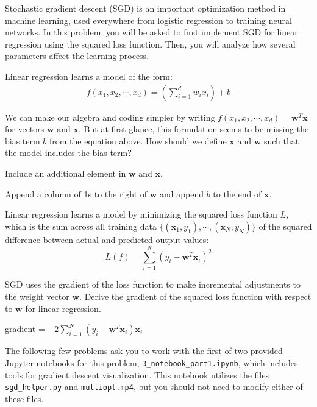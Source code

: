 Stochastic gradient descent (SGD) is an important optimization method in machine learning, used everywhere from logistic regression to training neural networks. In this problem, you will be asked to first implement SGD for linear regression using the squared loss function. Then, you will analyze how several parameters affect the learning process.

Linear regression learns a model of the form:
\begin{align*}
  f(x_1, x_2, \cdots, x_d) = \left(\sum_{i=1}^d w_i x_i\right) + b
\end{align*}

\begin{problem}[2]
  We can make our algebra and coding simpler by writing $f(x_1, x_2, \cdots, x_d) = \mathbf{w}^T\mathbf{x}$ for vectors $\mathbf{w}$ and $\mathbf{x}$.  But at first glance, this formulation seems to be missing the bias term $b$ from the equation above.  How should we define $\mathbf{x}$ and $\mathbf{w}$ such that the model includes the bias term?
\end{problem}
\begin{hint}
  Include an additional element in $\mathbf{w}$ and $\mathbf{x}$.
\end{hint}
\begin{solution}
  Append a column of 1s to the right of $\mathbf{w}$ and append $b$ to the end of $\mathbf{x}$.
\end{solution}

Linear regression learns a model by minimizing the squared loss function $L$, which is the sum across all training data $\{(\mathbf{x}_1, y_1),\cdots,(\mathbf{x}_N, y_N)\}$ of the squared difference between actual and predicted output values:
\[L(f) = \sum_{i=1}^N (y_i - \mathbf{w}^T\mathbf{x}_i)^2\]

\begin{problem}[2]
  SGD uses the gradient of the loss function to make incremental adjustments to the weight vector $\mathbf{w}$. Derive the gradient of the squared loss function with respect to $\mathbf{w}$ for linear regression.
\end{problem}
\begin{solution}
  gradient = $ -2 \sum_{i=1}^N (y_i - \mathbf{w}^T\mathbf{x}_i)\mathbf{x}_i $
\end{solution}

The following few problems ask you to work with the first of two provided Jupyter notebooks for this problem, \texttt{3_notebook_part1.ipynb}, which includes tools for gradient descent visualization. This notebook utilizes the files \texttt{sgd_helper.py} and \texttt{multiopt.mp4}, but you should not need to modify either of these files. 

